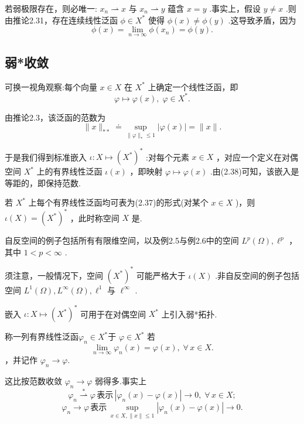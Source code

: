 若弱极限存在，则必唯一: ${x}_{n} \rightharpoonup  x$ 与 ${x}_{n} \rightharpoonup  y$ 蕴含 $x = y$ .事实上，假设 $y \neq  x$ .则由推论2.31，存在连续线性泛函 $\phi  \in  {X}^{ * }$ 使得 $\phi \left( x\right)  \neq  \phi \left( y\right)$ .这导致矛盾，因为
\[
\phi \left( x\right)  = \mathop{\lim }\limits_{{n \rightarrow  \infty }}\phi \left( {x}_{n}\right)  = \phi \left( y\right) .
\]

\subsection{弱*收敛}

可换一视角观察:每个向量 $x \in  X$ 在 ${X}^{ * }$ 上确定一个线性泛函，即
\begin{equation}\tag{2.37}
\varphi  \mapsto  \varphi \left( x\right) ,\;\varphi  \in  {X}^{ * }.
\end{equation}

由推论2.3，该泛函的范数为
\begin{equation}\tag{2.38}
\| x{\| }_{* * } \doteq  \mathop{\sup }\limits_{{\| \varphi {\| }_{ * } \leq  1}}\left| {\varphi \left( x\right) }\right|  = \| x\| .
\end{equation}

于是我们得到标准嵌入 $\iota  : X \mapsto  {\left( {X}^{ * }\right) }^{ * }$ :对每个元素 $x \in  X$ ，对应一个定义在对偶空间 ${X}^{ * }$ 上的有界线性泛函 $\iota \left( x\right)$ ，即映射 $\varphi  \mapsto  \varphi \left( x\right)$ .由(2.38)可知，该嵌入是等距的，即保持范数.
\begin{definition}[自反空间]
    若 ${X}^{ * }$ 上每个有界线性泛函均可表为(2.37)的形式(对某个 $x \in  X$ )，则 $\iota \left( X\right)  = {\left( {X}^{ * }\right) }^{ * }$ ，此时称空间 $X$ 是.
\end{definition}
自反空间的例子包括所有有限维空间，以及例2.5与例2.6中的空间 ${L}^{p}\left( \Omega \right) ,{\ell }^{p}$ ，其中 $1 < p < \infty$ .

须注意，一般情况下，空间 ${\left( {X}^{ * }\right) }^{ * }$ 可能严格大于 $\iota \left( X\right)$ .非自反空间的例子包括空间 ${L}^{1}\left( \Omega \right) ,{L}^{\infty }\left( \Omega \right) ,{\ell }^{1}$ 与 ${\ell }^{\infty }$ .

嵌入 $\iota  : X \mapsto  {\left( {X}^{ * }\right) }^{ * }$ 可用于在对偶空间 ${X}^{ * }$ 上引入弱*拓扑.
\begin{definition}[弱*收敛]
    称一列有界线性泛函${\varphi }_{n} \in  {X}^{ * }$于 $\varphi  \in  {X}^{ * }$ 若
\begin{equation}\tag{2.39}
\lim_{n \rightarrow  \infty }{\varphi }_{n}\left( x\right)  = \varphi \left( x\right),\;\forall\,x \in  X.
\end{equation}
，并记作 ${\varphi }_{n} \rightarrow  \varphi$.
\end{definition}
这比按范数收敛 ${\varphi }_{n} \rightarrow  \varphi$ 弱得多.事实上
\[{\varphi }_{n}\overset{ * }{ \rightharpoonup  }\varphi \,\text{表示}\,\left| {{\varphi }_{n}\left( x\right)  - \varphi \left( x\right) }\right|  \rightarrow  0,\;\forall\, x\in X;\] 
\[{\varphi }_{n} \rightarrow  \varphi\,\text{表示}\,\sup_{{x \in  X,\| x\|  \leq  1}}\left| {{\varphi }_{n}\left( x\right)  - \varphi \left( x\right) }\right|  \rightarrow  0.\]

